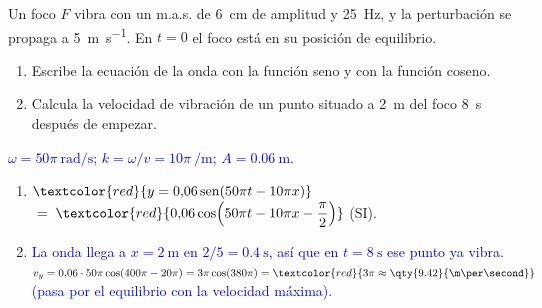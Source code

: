\begin{exercise}
    Un foco \(F\) vibra con un m.a.s. de \qty{6}{\cm} de amplitud y \qty{25}{\hertz}, y la perturbación se propaga a
    \qty{5}{\m\per\second}. En \(t = 0\) el foco está en su posición de equilibrio.
    \begin{enumerate}[label=\letraminuscula]
        \item Escribe la ecuación de la onda con la función seno y con la función coseno.
        \item Calcula la velocidad de vibración de un punto situado a \qty{2}{\m} del foco \qty{8}{\second} después de empezar.
    \end{enumerate}
    \begin{solu}
        \textcolor{blue}{\(\omega = 50\pi\ \unit{\radian\per\second}\); \(k = \omega/v = 10\pi\ \unit{\per\m}\); \(A = \qty{0.06}{\m}\).}
        \begin{enumerate}[label=\letraminuscula]
            \item \(\textcolor{red}{y = 0{,}06\sen(50\pi t - 10\pi x)}\) \(\;=\; \textcolor{red}{0{,}06\cos\!\left(50\pi t - 10\pi x - \dfrac{\pi}{2}\right)}\) (SI).
            \item \textcolor{blue}{La onda llega a \(x = \qty{2}{\m}\) en \(2/5 = \qty{0.4}{\second}\), así que en \(t = \qty{8}{\second}\) ese punto ya vibra.}
            \(v_y = 0{,}06\cdot 50\pi\cos(400\pi - 20\pi) = 3\pi\cos(380\pi) = \textcolor{red}{3\pi \approx \qty{9.42}{\m\per\second}}\)
            \textcolor{blue}{(pasa por el equilibrio con la velocidad máxima).}
        \end{enumerate}
    \end{solu}
\end{exercise}

